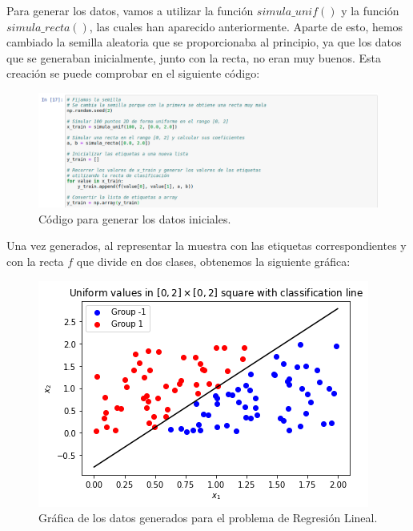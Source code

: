 \documentclass[11pt,a4paper]{article}
\begin{document}
Para generar los datos, vamos a utilizar la función $simula\_unif()$ y la función $simula\_recta()$,
las cuales han aparecido anteriormente. Aparte de esto, hemos cambiado la semilla aleatoria que se
proporcionaba al principio, ya que los datos que se generaban inicialmente, junto con la recta, no
eran muy buenos. Esta creación se puede comprobar en el siguiente código:

\begin{figure}[H]
\centering
\includegraphics[scale=0.4]{img/init_data.png}
\caption{Código para generar los datos iniciales.}
\end{figure}

Una vez generados, al representar la muestra con las etiquetas correspondientes y con la recta
$f$ que divide en dos clases, obtenemos la siguiente gráfica:

\begin{figure}[H]
\centering
\includegraphics[scale=0.6]{img/regression_1.png}
\caption{Gráfica de los datos generados para el problema de Regresión Lineal.}
\end{figure}
\end{document}
